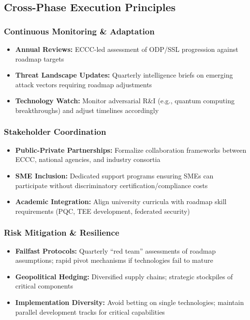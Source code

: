\documentclass{ieeeaccess}
\begin{document}
\subsection*{Cross-Phase Execution Principles}

\subsubsection*{Continuous Monitoring \& Adaptation}
\begin{itemize}
    \item \textbf{Annual Reviews:} ECCC-led assessment of ODP/SSL progression against roadmap targets
    \item \textbf{Threat Landscape Updates:} Quarterly intelligence briefs on emerging attack vectors requiring roadmap adjustments
    \item \textbf{Technology Watch:} Monitor adversarial R\&I (e.g., quantum computing breakthroughs) and adjust timelines accordingly
\end{itemize}

\subsubsection*{Stakeholder Coordination}
\begin{itemize}
    \item \textbf{Public-Private Partnerships:} Formalize collaboration frameworks between ECCC, national agencies, and industry consortia
    \item \textbf{SME Inclusion:} Dedicated support programs ensuring SMEs can participate without discriminatory certification/compliance costs
    \item \textbf{Academic Integration:} Align university curricula with roadmap skill requirements (PQC, TEE development, federated security)
\end{itemize}

\subsubsection*{Risk Mitigation \& Resilience}
\begin{itemize}
    \item \textbf{Failfast Protocols:} Quarterly ``red team''  assessments of roadmap assumptions; rapid pivot mechanisms if technologies fail to mature
    \item \textbf{Geopolitical Hedging:} Diversified supply chains; strategic stockpiles of critical components
    \item \textbf{Implementation Diversity:} Avoid betting on single technologies; maintain parallel development tracks for critical capabilities
\end{itemize}
\end{document}
